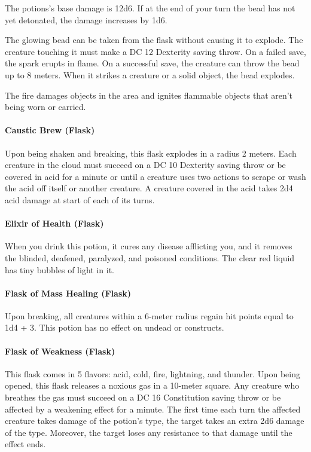     The potions's base damage is 12d6.
    If at the end of your turn the bead has not yet detonated, the damage increases by 1d6.

    The glowing bead can be taken from the flask without causing it to explode.
    The creature touching it must make a DC 12 Dexterity saving throw.
    On a failed save, the spark erupts in flame.
    On a successful save, the creature can throw the bead up to 8 meters.
    When it strikes a creature or a solid object, the bead explodes.

    The fire damages objects in the area and ignites flammable objects that aren't being worn or carried.
\paragraph{Caustic Brew (Flask)} %
    Upon being shaken and breaking, this flask explodes in a radius 2 meters.
    Each creature in the cloud must succeed on a DC 10 Dexterity saving throw or be covered in acid for a minute or until a creature uses two actions to scrape or wash the acid off itself or another creature.
    A creature covered in the acid takes 2d4 acid damage at start of each of its turns.
\paragraph{Elixir of Health (Flask)}
    When you drink this potion, it cures any disease afflicting you, and it removes the blinded, deafened, paralyzed, and poisoned conditions.
    The clear red liquid has tiny bubbles of light in it.
\paragraph{Flask of Mass Healing (Flask)} %
    Upon breaking, all creatures within a 6-meter radius regain hit points equal to 1d4 + 3.
    This potion has no effect on undead or constructs.
\paragraph{Flask of Weakness (Flask)} %
    This flask comes in 5 flavors: acid, cold, fire, lightning, and thunder.
    Upon being opened, this flask releases a noxious gas in a 10-meter square.
    Any creature who breathes the gas must succeed on a DC 16 Constitution saving throw or be affected by a weakening effect for a minute.
    The first time each turn the affected creature takes damage of the potion's type, the target takes an extra 2d6 damage of the type.
    Moreover, the target loses any resistance to that damage until the effect ends.
